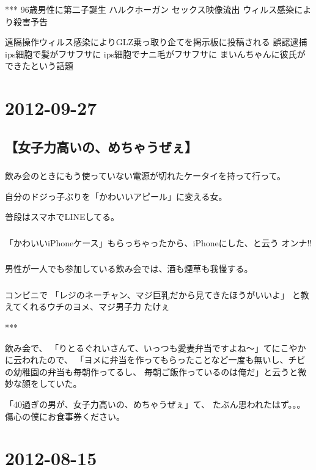 \documentclass[11pt]{article}
\begin{document}
***
96歳男性に第二子誕生
ハルクホーガン セックス映像流出
ウィルス感染により殺害予告

遠隔操作ウィルス感染によりGLZ乗っ取り企てを掲示板に投稿される
誤認逮捕
ips細胞で髪がフサフサに
ips細胞でナニ毛がフサフサに
まいんちゃんに彼氏ができたという話題
\section{2012-09-27}
\label{sec-5}
\subsection{【女子力高いの、めちゃうぜぇ】}
\label{sec-5_1}
\subsubsection{}

飲み会のときにもう使っていない電源が切れたケータイを持って行って。

自分のドジっ子ぶりを「かわいいアピール」に変える女。

普段はスマホでLINEしてる。
\subsubsection{}

「かわいいiPhoneケース」もらっちゃったから、iPhoneにした、と云う オンナ!!
\subsubsection{}

男性が一人でも参加している飲み会では、酒も煙草も我慢する。
\subsubsection{}

コンビニで
「レジのネーチャン、マジ巨乳だから見てきたほうがいいよ」
と教えてくれるウチのヨメ、マジ男子力 たけぇ

***

飲み会で、
「りとるぐれいさんて、いっつも愛妻弁当ですよね〜」てにこやかに云われたので、
「ヨメに弁当を作ってもらったことなど一度も無いし、チビの幼稚園の弁当も毎朝作ってるし、
  毎朝ご飯作っているのは俺だ」と云うと微妙な顔をしていた。

「40過ぎの男が、女子力高いの、めちゃうぜぇ」て、
たぶん思われたはず。。。 傷心の僕にお食事券ください。
\section{2012-08-15}
\label{sec-6}
\end{document}
